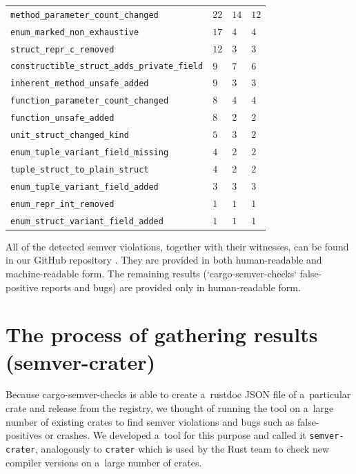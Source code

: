 \documentclass[licencjacka,en]{pracamgr}
\newcommand\Bspace{\rule[-0.9ex]{0pt}{0pt}}   %
\begin{document}
\begin{center}
\begin{longtable}{| p{7.75cm} | p{1.975cm} | p{1.975cm} | p{1.975cm} |}
			\texttt{method\_parameter\_count\_changed} & $22$ & $14$ & $12$ \\
			\texttt{enum\_marked\_non\_exhaustive} & $17$ & $4$ & $4$ \\
			\texttt{struct\_repr\_c\_removed} & $12$ & $3$ & $3$ \\
			\texttt{constructible\_struct\_adds\_private\_field} & $9$ & $7$ & $6$ \\
			\texttt{inherent\_method\_unsafe\_added} & $9$ & $3$ & $3$ \\
			\texttt{function\_parameter\_count\_changed} & $8$ & $4$ & $4$ \\
			\texttt{function\_unsafe\_added} & $8$ & $2$ & $2$ \\
			\texttt{unit\_struct\_changed\_kind} & $5$ & $3$ & $2$ \\
			\texttt{enum\_tuple\_variant\_field\_missing} & $4$ & $2$ & $2$ \\
			\texttt{tuple\_struct\_to\_plain\_struct} & $4$ & $2$ & $2$ \\
			\texttt{enum\_tuple\_variant\_field\_added} & $3$ & $3$ & $3$ \\
			\texttt{enum\_repr\_int\_removed} & $1$ & $1$ & $1$ \\
			\texttt{enum\_struct\_variant\_field\_added} & $1$ & $1$ & $1$ \Bspace \\
		\hline
	\end{longtable}
\end{center}

All of the detected semver violations, together with their witnesses, can be found in our
GitHub repository \cite{github-csv-results}. They are provided in both human-readable
and machine-readable form. The remaining results (`cargo-semver-checks` false-positive reports
and bugs) are provided only in human-readable form.

\section{The process of gathering results (semver-crater)}\label{r:section_results_semver_crater}

Because cargo-semver-checks is able to create a~rustdoc JSON file
of a~particular crate and release from the registry,
we thought of running the tool on a~large number of existing crates
to find semver violations and bugs such as false-positives or crashes.
We developed a~tool for this purpose and called it \texttt{semver-crater},
analogously to \texttt{crater} which is used by the Rust team to check
new compiler versions on a~large number of crates.
\end{document}
